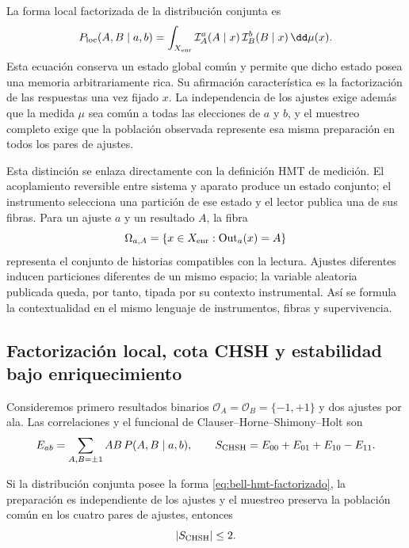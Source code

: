 La forma local factorizada de la distribución conjunta es
\begin{equation}
 P_{\rm loc}(A,B\mid a,b)
 =\int_{X_{\rm enr}}
   \mathcal I_A^a(A\mid x)\,
   \mathcal I_B^b(B\mid x)\,\dd\mu(x).
 \label{eq:bell-hmt-factorizado}
\end{equation}
Esta ecuación conserva un estado global común y permite que dicho estado posea una
memoria arbitrariamente rica. Su afirmación característica es la factorización de
las respuestas una vez fijado \(x\). La independencia de los ajustes exige además
que la medida \(\mu\) sea común a todas las elecciones de \(a\) y \(b\), y el
muestreo completo exige que la población observada represente esa misma preparación
en todos los pares de ajustes.

Esta distinción se enlaza directamente con la definición HMT de medición. El
acoplamiento reversible entre sistema y aparato produce un estado conjunto; el
instrumento selecciona una partición de ese estado y el lector publica una de sus
fibras. Para un ajuste \(a\) y un resultado \(A\), la fibra
\[
 \Omega_{a,A}
 =\{x\in X_{\rm enr}:\operatorname{Out}_a(x)=A\}
\]
representa el conjunto de historias compatibles con la lectura. Ajustes diferentes
inducen particiones diferentes de un mismo espacio; la variable aleatoria publicada
queda, por tanto, tipada por su contexto instrumental. Así se formula la
contextualidad en el mismo lenguaje de instrumentos, fibras y supervivencia.

\subsection{Factorización local, cota CHSH y estabilidad bajo enriquecimiento}

Consideremos primero resultados binarios
\(\mathcal O_A=\mathcal O_B=\{-1,+1\}\) y dos ajustes por ala. Las
correlaciones y el funcional de Clauser--Horne--Shimony--Holt \cite{ClauserHorneShimonyHolt1969} son
\begin{equation}
 E_{ab}=\sum_{A,B=\pm1}AB\,P(A,B\mid a,b),
 \qquad
 S_{\rm CHSH}=E_{00}+E_{01}+E_{10}-E_{11}.
 \label{eq:chsh}
\end{equation}

\begin{theorem}
\label{thm:chsh-local}
Si la distribución conjunta posee la forma
\eqref{eq:bell-hmt-factorizado}, la preparación es independiente de los ajustes y
el muestreo preserva la población común en los cuatro pares de ajustes, entonces
\[
 \lvert S_{\rm CHSH}\rvert\leq2.
\]
\end{theorem}

